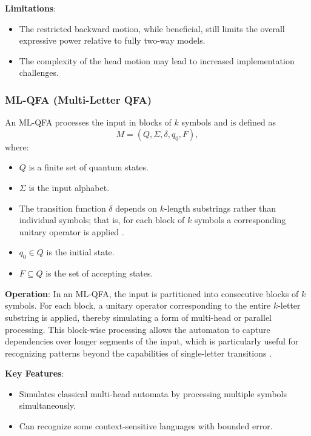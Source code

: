 \textbf{Limitations}: 
\begin{itemize}
    \item The restricted backward motion, while beneficial, still limits the overall expressive power relative to fully two-way models.
    \item The complexity of the head motion may lead to increased implementation challenges.
\end{itemize}

\subsubsection{ML-QFA (Multi-Letter QFA)}
\label{sssec:ml-qfa}
\begin{definition}[ML-QFA]
An ML-QFA processes the input in blocks of \( k \) symbols and is defined as 
\[
M = (Q, \Sigma, \delta, q_0, F),
\]
where:
\begin{itemize}
    \item \( Q \) is a finite set of quantum states.
    \item \( \Sigma \) is the input alphabet.
    \item The transition function \(\delta\) depends on \( k \)-length substrings rather than individual symbols; that is, for each block of \( k \) symbols a corresponding unitary operator is applied \cite{belovs2007multi}.
    \item \( q_0 \in Q \) is the initial state.
    \item \( F \subseteq Q \) is the set of accepting states.
\end{itemize}
\end{definition}

\textbf{Operation}:  
In an ML-QFA, the input is partitioned into consecutive blocks of \( k \) symbols. For each block, a unitary operator corresponding to the entire \( k \)-letter substring is applied, thereby simulating a form of multi-head or parallel processing. This block-wise processing allows the automaton to capture dependencies over longer segments of the input, which is particularly useful for recognizing patterns beyond the capabilities of single-letter transitions \cite{belovs2007multi}.

\textbf{Key Features}:
\begin{itemize}
    \item Simulates classical multi-head automata by processing multiple symbols simultaneously.
    \item Can recognize some context-sensitive languages with bounded error.
\end{itemize}

